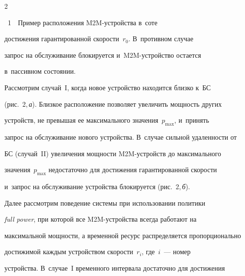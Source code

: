 \begin{multicols}{2}
{\noindent


{{\figurename~1}\ \ \small{Пример расположения M2M-устройства в~соте}}


}





\vspace*{9pt}





\addtocounter{figure}{1} 





\noindent


 достижения гарантированной скорости~$r_0$. В~противном случае 


запрос на обслуживание блокируется и~M2M-устрой\-ст\-во остается 


в~пассивном со\-сто\-янии. 


  


  Рассмотрим случай~I, когда новое устройство находится близко к~БС 


(рис.~2,\,\textit{а}). Близкое расположение позволяет увеличить мощность других 


устройств, не превышая ее максимального значения~$p_{\max}$, и~принять 


запрос на обслуживание нового устройства. В~случае сильной удаленности от 


БС (случай~II) увеличения мощности M2M-устройств до максимального 


значения~$p_{\max}$ недостаточно для достижения гарантированной ско\-рости 


и~запрос на обслуживание устройства блокируется (рис.~2,\,\textit{б}). 


  











  Далее рассмотрим поведение системы при использовании политики 


\textit{full power}, при которой все M2M-устрой\-ст\-ва всегда работают на 


максимальной мощности, а временной ресурс распределяется пропорционально 


достижимой каждым устройством скорости~$r_i$, где~$i$~--- номер 


устройства. В~случае~I временного интервала достаточно для достижения 



\end{multicols}
